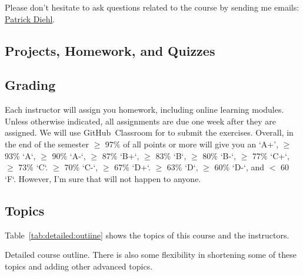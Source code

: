 \documentclass[11pt,letterpaper]{article}
\begin{document}
Please don’t hesitate to ask questions related to the course by sending me emails: \href{mailto:patrickdiehl@lsu.edu}{Patrick Diehl}. 

\subsection*{Projects, Homework, and Quizzes}

\subsection*{Grading}
Each instructor will assign you homework, including online learning modules. Unless otherwise indicated, all assignments are due one week after they are assigned. We will use GitHub\textsuperscript{\textregistered}~Classroom for to submit the exercises.  Overall, in the end of the semester $\geq$ 97\% of all points or more will give you an ‘A+’,  $\geq$ 93\% `A`,  $\geq$ 90\% `A-`,  $\geq$  87\% `B+`,  $\geq$  83\% `B`,  $\geq$  80\% `B-`,  $\geq$ 77\% `C+`,  $\geq$ 73\% `C`.  $\geq$  70\% `C-`,  $\geq$  67\% `D+`.  $\geq$  63\% `D`,  $\geq$  60\% `D-`, and $<$ 60 `F`. However, I’m sure that will not happen to anyone.


\subsection*{Topics}
Table~\ref{tab:detailed:outiine} shows the topics of this course and the instructors.

\begin{table}[tbp]
\caption{Detailed course outline. There  is  also some flexibility in shortening some of these topics and adding other advanced topics.}
\label{tab:detailed:outiine}
\end{table}
\end{document}
